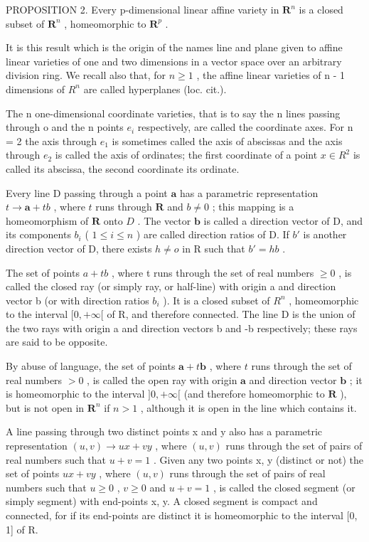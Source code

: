 PROPOSITION 2. Every p-dimensional linear affine variety in \(\mathbf{R}^n\) is a closed subset of \(\mathbf{R}^n\) , homeomorphic to \(\mathbf{R}^p\) .

It is this result which is the origin of the names line and plane given to affine linear varieties of one and two dimensions in a vector space over an arbitrary division ring. We recall also that, for \(n \geqslant 1\) , the affine linear varieties of n - 1 dimensions of \(R^{n}\) are called hyperplanes (loc. cit.).

The n one-dimensional coordinate varieties, that is to say the n lines passing through o and the n points \(e_{i}\) respectively, are called the coordinate axes. For n = 2 the axis through \(e_{1}\) is sometimes called the axis of abscissas and the axis through \(e_{2}\) is called the axis of ordinates; the first coordinate of a point \(x \in R^{2}\) is called its abscissa, the second coordinate its ordinate.

Every line D passing through a point \(\pmb{a}\) has a parametric representation \(t \to \pmb{a} + tb\) , where \(t\) runs through \(\mathbf{R}\) and \(b \neq 0\) ; this mapping is a homeomorphism of \(\mathbf{R}\) onto \(D\) . The vector \(\pmb{b}\) is called a direction vector of D, and its components \(b_{i}\) ( \(1 \leqslant i \leqslant n\) ) are called direction ratios of D. If \(b'\) is another direction vector of D, there exists \(h \neq o\) in R such that \(b' = hb\) .

The set of points \(a + tb\) , where t runs through the set of real numbers \(\geqslant 0\) , is called the closed ray (or simply ray, or half-line) with origin a and direction vector b (or with direction ratios \(b_{i}\) ). It is a closed subset of \(R^{n}\) , homeomorphic to the interval \([0, +\infty[\) of R, and therefore connected. The line D is the union of the two rays with origin a and direction vectors b and -b respectively; these rays are said to be opposite.

By abuse of language, the set of points \(\pmb{a} + t\pmb{b}\) , where \(t\) runs through the set of real numbers \(> 0\) , is called the open ray with origin \(\pmb{a}\) and direction vector \(\pmb{b}\) ; it is homeomorphic to the interval \(]0, +\infty[\) (and therefore homeomorphic to \(\mathbf{R}\) ), but is not open in \(\mathbf{R}^n\) if \(n > 1\) , although it is open in the line which contains it.

A line passing through two distinct points x and y also has a parametric representation \((u, v) \to ux + vy\) , where \((u, v)\) runs through the set of pairs of real numbers such that \(u + v = 1\) . Given any two points x, y (distinct or not) the set of points \(ux + vy\) , where \((u, v)\) runs through the set of pairs of real numbers such that \(u \geqslant 0\) , \(v \geqslant 0\) and \(u + v = 1\) , is called the closed segment (or simply segment) with end-points x, y. A closed segment is compact and connected, for if its end-points are distinct it is homeomorphic to the interval {[}0, 1{]} of R.

